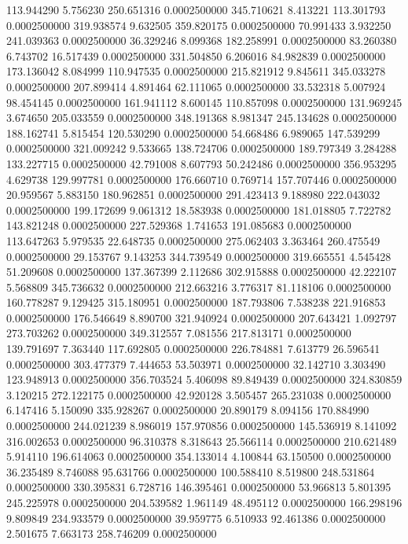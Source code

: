 113.944290 5.756230 250.651316 0.0002500000
345.710621 8.413221 113.301793 0.0002500000
319.938574 9.632505 359.820175 0.0002500000
70.991433 3.932250 241.039363 0.0002500000
36.329246 8.099368 182.258991 0.0002500000
83.260380 6.743702 16.517439 0.0002500000
331.504850 6.206016 84.982839 0.0002500000
173.136042 8.084999 110.947535 0.0002500000
215.821912 9.845611 345.033278 0.0002500000
207.899414 4.891464 62.111065 0.0002500000
33.532318 5.007924 98.454145 0.0002500000
161.941112 8.600145 110.857098 0.0002500000
131.969245 3.674650 205.033559 0.0002500000
348.191368 8.981347 245.134628 0.0002500000
188.162741 5.815454 120.530290 0.0002500000
54.668486 6.989065 147.539299 0.0002500000
321.009242 9.533665 138.724706 0.0002500000
189.797349 3.284288 133.227715 0.0002500000
42.791008 8.607793 50.242486 0.0002500000
356.953295 4.629738 129.997781 0.0002500000
176.660710 0.769714 157.707446 0.0002500000
20.959567 5.883150 180.962851 0.0002500000
291.423413 9.188980 222.043032 0.0002500000
199.172699 9.061312 18.583938 0.0002500000
181.018805 7.722782 143.821248 0.0002500000
227.529368 1.741653 191.085683 0.0002500000
113.647263 5.979535 22.648735 0.0002500000
275.062403 3.363464 260.475549 0.0002500000
29.153767 9.143253 344.739549 0.0002500000
319.665551 4.545428 51.209608 0.0002500000
137.367399 2.112686 302.915888 0.0002500000
42.222107 5.568809 345.736632 0.0002500000
212.663216 3.776317 81.118106 0.0002500000
160.778287 9.129425 315.180951 0.0002500000
187.793806 7.538238 221.916853 0.0002500000
176.546649 8.890700 321.940924 0.0002500000
207.643421 1.092797 273.703262 0.0002500000
349.312557 7.081556 217.813171 0.0002500000
139.791697 7.363440 117.692805 0.0002500000
226.784881 7.613779 26.596541 0.0002500000
303.477379 7.444653 53.503971 0.0002500000
32.142710 3.303490 123.948913 0.0002500000
356.703524 5.406098 89.849439 0.0002500000
324.830859 3.120215 272.122175 0.0002500000
42.920128 3.505457 265.231038 0.0002500000
6.147416 5.150090 335.928267 0.0002500000
20.890179 8.094156 170.884990 0.0002500000
244.021239 8.986019 157.970856 0.0002500000
145.536919 8.141092 316.002653 0.0002500000
96.310378 8.318643 25.566114 0.0002500000
210.621489 5.914110 196.614063 0.0002500000
354.133014 4.100844 63.150500 0.0002500000
36.235489 8.746088 95.631766 0.0002500000
100.588410 8.519800 248.531864 0.0002500000
330.395831 6.728716 146.395461 0.0002500000
53.966813 5.801395 245.225978 0.0002500000
204.539582 1.961149 48.495112 0.0002500000
166.298196 9.809849 234.933579 0.0002500000
39.959775 6.510933 92.461386 0.0002500000
2.501675 7.663173 258.746209 0.0002500000
